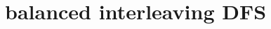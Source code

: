 \documentclass[format=acmlarge, review=true, authordraft=true]{acmart}
\newcommand{\conde}{\texttt{cond$^e$} }
\begin{document}
% 
% 
%    
% 
% 
%    
% 
% 
% 		
% 
% 
% 		
 
\section{balanced interleaving DFS}
\end{document}
